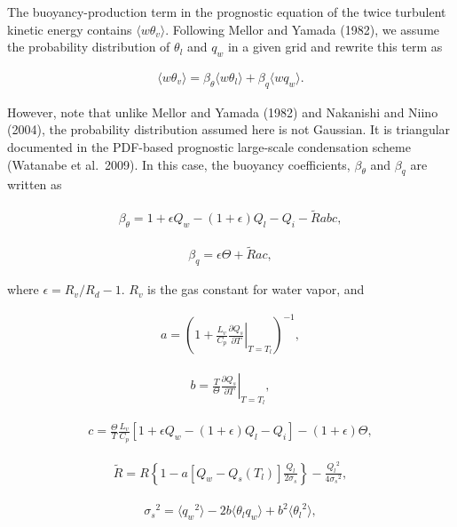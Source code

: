 The buoyancy-production term in the prognostic equation of the twice turbulent kinetic energy contains \(\langle w\theta_v \rangle\). Following Mellor and Yamada (1982), we assume the probability
distribution of \(\theta_l\) and \(q_w\) in a given grid and rewrite this term as

\begin{eqnarray}\langle w\theta_v \rangle=\beta_\theta \langle w\theta_l \rangle + \beta_q \langle wq_w \rangle.\end{eqnarray}

However, note that unlike Mellor and Yamada (1982) and Nakanishi and Niino (2004), the probability distribution assumed here is not Gaussian. It is triangular documented in the PDF-based prognostic
large-scale condensation scheme (Watanabe et al.~2009). In this case, the buoyancy coefficients, \(\beta_\theta\) and \(\beta_q\) are written as

\begin{eqnarray}\beta_\theta=1+\epsilon Q_w-(1+\epsilon)Q_l-Q_i-\tilde{R}abc,\end{eqnarray}

\begin{eqnarray}\beta_q=\epsilon \Theta +\tilde{R}ac,\end{eqnarray}

where \(\epsilon=R_v/R_d-1\). \(R_v\) is the gas constant for water vapor, and

\begin{eqnarray}a=\left(1+\frac{L_v}{C_p}\left.\frac{\partial Q_s}{\partial T}\right|_{T=T_l}\right)^{-1},\end{eqnarray}

\begin{eqnarray}b=\frac{T}{\Theta}\left.\frac{\partial Q_s}{\partial T}\right|_{T=T_l},\end{eqnarray}

\begin{eqnarray}c=\frac{\Theta}{T}\frac{L_v}{C_p}\left[1+\epsilon Q_w-(1+\epsilon)Q_l-Q_i\right]-(1+\epsilon)\Theta,\end{eqnarray}

\begin{eqnarray}\tilde{R}=R\left\{1-a\left[Q_w-Q_s(T_l)\right]\frac{Q_l}{2\sigma_s}\right\}-\frac{{Q_l}^2}{4{\sigma_s}^2},\end{eqnarray}

\begin{eqnarray}{\sigma_s}^2=\langle {q_w}^2 \rangle -2b \langle \theta_l q_w \rangle + b^2\langle {\theta_l}^2 \rangle,\end{eqnarray}

